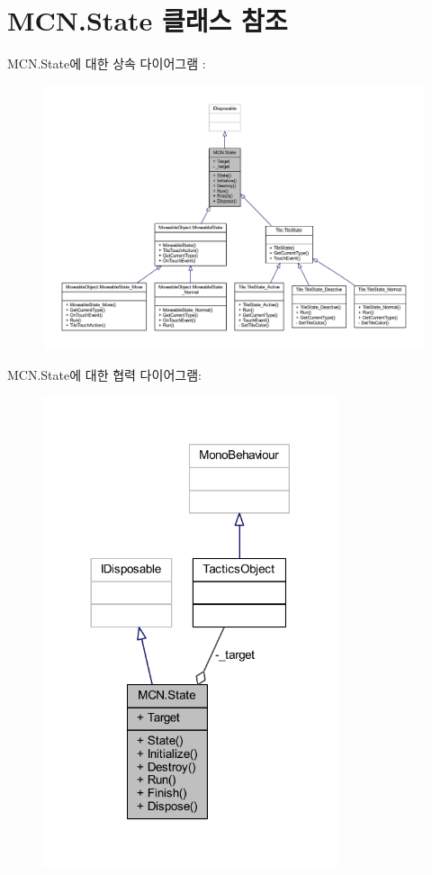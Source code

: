 \hypertarget{class_m_c_n_1_1_state}{}\section{M\+C\+N.\+State 클래스 참조}
\label{class_m_c_n_1_1_state}


M\+C\+N.\+State에 대한 상속 다이어그램 \+: \nopagebreak
\begin{figure}[H]
\begin{center}
\leavevmode
\includegraphics[width=350pt]{class_m_c_n_1_1_state__inherit__graph}
\end{center}
\end{figure}


M\+C\+N.\+State에 대한 협력 다이어그램\+:\nopagebreak
\begin{figure}[H]
\begin{center}
\leavevmode
\includegraphics[width=245pt]{class_m_c_n_1_1_state__coll__graph}
\end{center}
\end{figure}
